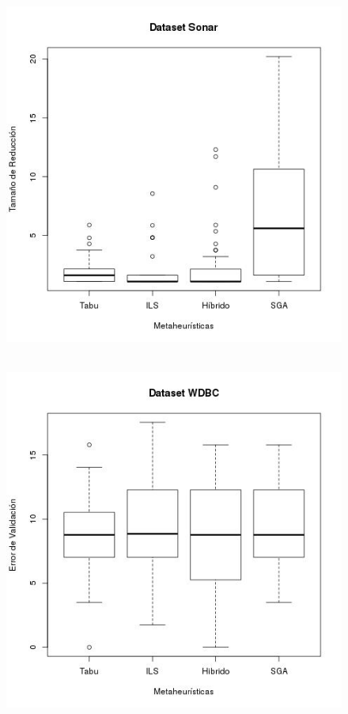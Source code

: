 \documentclass[11pt]{article}
\begin{document}
\begin{figure}[h!]
\begin{center}
  \includegraphics[scale=0.4]{sonar_tam_red.jpeg}~\\[1cm]
\end{center}
\end{figure}

\begin{figure}[h!]
\begin{center}
  \includegraphics[scale=0.4]{wdbc_err_val.jpeg}~\\[1cm]
\end{center}
\end{figure}
\end{document}
